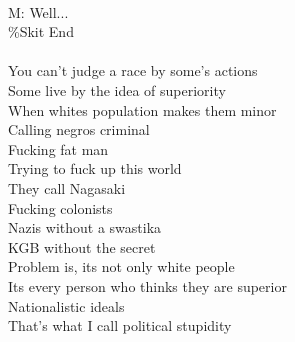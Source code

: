 \documentclass[12pt, b5paper, oneside]{book}
\begin{document}
\\M: Well...
\\\%Skit End
%
\\\\You can't judge a race by some's actions
\\Some live by the idea of superiority
\\When whites population makes them minor
\\Calling negros criminal
\\Fucking fat man
\\Trying to fuck up this world
\\They call Nagasaki
\\Fucking colonists
\\Nazis without a swastika
\\KGB without the secret
\\Problem is, its not only white people
\\Its every person who thinks they are superior
\\Nationalistic ideals
\\That's what I call political stupidity
\newpage
\end{document}
